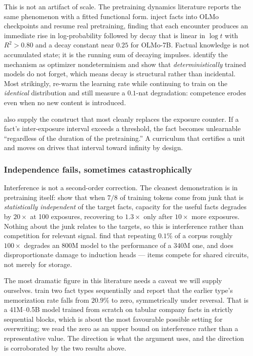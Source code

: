 \documentclass[11pt]{article}
\theoremstyle{plain}
\theoremstyle{definition}
\theoremstyle{remark}
\begin{document}
This is not an artifact of scale. The pretraining dynamics literature reports the
same phenomenon with a fitted functional form. \citet{chang2024acquire} inject
facts into OLMo checkpoints and resume real pretraining, finding that each
encounter produces an immediate rise in log-probability followed by decay that is
linear in $\log t$ with $R^2 > 0.80$ and a decay constant near $0.25$ for
OLMo-7B. Factual knowledge is not accumulated state; it is the running sum of
decaying impulses. \citet{jagielski2023forgetting} identify the mechanism as
optimizer nondeterminism and show that \emph{deterministically} trained models do
not forget, which means decay is structural rather than incidental. Most
strikingly, \citet{ibrahim2024simple} re-warm the learning rate while continuing
to train on the \emph{identical} distribution and still measure a $0.1$-nat
degradation: competence erodes even when no new content is introduced.

\citet{chang2024acquire} also supply the construct that most cleanly replaces the
exposure counter. If a fact's inter-exposure interval exceeds a threshold, the
fact becomes unlearnable ``regardless of the duration of the pretraining.'' A
curriculum that certifies a unit and moves on drives that interval toward
infinity by design.

\subsubsection{Independence fails, sometimes catastrophically}

Interference is not a second-order correction. The cleanest demonstration is in
pretraining itself: \citet{allenzhu2024} show that when $7/8$ of training
tokens come from junk that is \emph{statistically independent} of the target
facts, capacity for the useful facts degrades by $20\times$ at 100 exposures,
recovering to $1.3\times$ only after $10\times$ more exposures. Nothing about the
junk relates to the targets, so this is interference rather than competition for
relevant signal. \citet{hernandez2022repeated} find that repeating $0.1\%$ of a
corpus roughly $100\times$ degrades an 800M model to the performance of a 340M
one, and does disproportionate damage to induction heads --- items compete for
shared circuits, not merely for storage.

The most dramatic figure in this literature needs a caveat we will supply
ourselves. \citet{lu2024} train two fact types sequentially and
report that the earlier type's memorization rate falls from $20.9\%$ to zero,
symmetrically under reversal. That is a 41M--0.5B model trained from scratch on
tabular company facts in strictly sequential blocks, which is about the most
favourable possible setting for overwriting; we read the zero as an upper bound
on interference rather than a representative value. The direction is what the
argument uses, and the direction is corroborated by the two results above.
\end{document}
